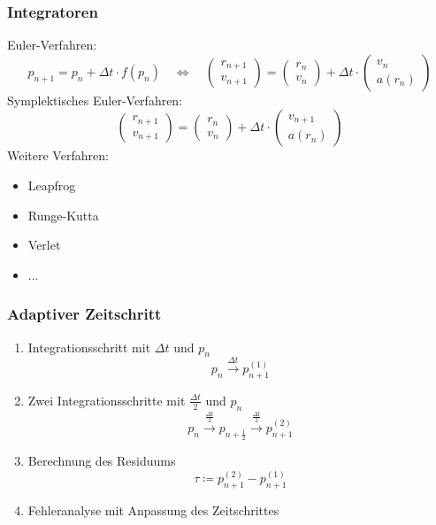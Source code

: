 \documentclass[aspectratio=169]{beamer}
\newcommand{\define}{\coloneqq}
\begin{document}
    \begin{frame}
      \frametitle{Integratoren}
      Euler-Verfahren:
      \[
        p_{n+1} = p_n + \Delta t \cdot f(p_n) \quad\iff\quad
        \begin{pmatrix}
          r_{n+1} \\ v_{n+1}
        \end{pmatrix}
        =
        \begin{pmatrix}
          r_{n} \\ v_{n}
        \end{pmatrix}
        + \Delta t\cdot
        \begin{pmatrix}
          v_n \\ a(r_n)
        \end{pmatrix}
      \]
      \pause
      Symplektisches Euler-Verfahren:
      \[
        \begin{pmatrix}
          r_{n+1} \\ v_{n+1}
        \end{pmatrix}
        =
        \begin{pmatrix}
          r_{n} \\ v_{n}
        \end{pmatrix}
        + \Delta t\cdot
        \begin{pmatrix}
          v_{n+1} \\ a(r_n)
        \end{pmatrix}
      \]
      \pause
      Weitere Verfahren:
      \begin{itemize}
        \item Leapfrog
        \item Runge-Kutta
        \item Verlet
        \item ...
      \end{itemize}
    \end{frame}

    \begin{frame}
      \frametitle{Adaptiver Zeitschritt}
      \begin{enumerate}
        \item Integrationsschritt mit $\Delta t$ und $p_n$
          \[
            p_n \xrightarrow{\Delta t} p_{n+1}^{(1)}
          \]
        \item Zwei Integrationsschritte mit $\frac{\Delta t}{2}$ und $p_n$
          \[
            p_n \xrightarrow{\frac{\Delta t}{2}} p_{n+\frac{1}{2}} \xrightarrow{\frac{\Delta t}{2}} p_{n+1}^{(2)}
          \]

        \item Berechnung des Residuums
          \[
            \tau \define p_{n+1}^{(2)} - p_{n+1}^{(1)}
          \]
        \item Fehleranalyse mit Anpassung des Zeitschrittes
      \end{enumerate}
    \end{frame}
\end{document}
